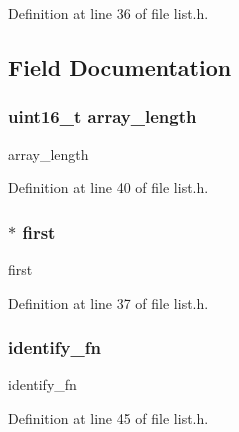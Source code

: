 Definition at line 36 of file list.\+h.



\subsection{Field Documentation}
\hypertarget{structlist__t_a6eb0ced064750a0a9f0b5c6018f16db4}{}
\subsubsection[{array\+\_\+length}]{\setlength{\rightskip}{0pt plus 5cm}uint16\+\_\+t array\+\_\+length}\label{structlist__t_a6eb0ced064750a0a9f0b5c6018f16db4}


array\+\_\+length 



Definition at line 40 of file list.\+h.

\hypertarget{structlist__t_ac9669705521df6aa1e4e92369b46619d}{}
\subsubsection[{first}]{$\ast$ first}\label{structlist__t_ac9669705521df6aa1e4e92369b46619d}


first 



Definition at line 37 of file list.\+h.

\hypertarget{structlist__t_a06c316a9560c5d58461c9237d0a81f69}{}
\subsubsection[{identify\+\_\+fn}]{ identify\+\_\+fn}\label{structlist__t_a06c316a9560c5d58461c9237d0a81f69}


identify\+\_\+fn 



Definition at line 45 of file list.\+h.

\hypertarget{structlist__t_a3826fdc3e2faf8cbe23972788ca9c3ba}{}
